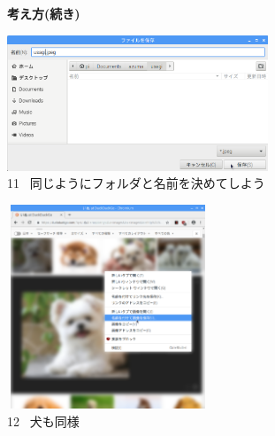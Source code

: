 \documentclass[a4paper,12pt]{jarticle}
\begin{document}
\begin{figure}[t]
  \textbf{考え方(続き)}



  \centering
  \begin{minipage}{\textwidth}
    \begin{minipage}{7.882cm}
      \includegraphics[width=7.811cm,height=4.053cm]{textbook-img103.png}\\
      11 \ 同じようにフォルダと名前を決めてしよう
    \end{minipage}
    \begin{minipage}{2.582cm}
    \end{minipage}
    \begin{minipage}{6.257cm}
      \includegraphics[width=6.041cm,height=6.094cm]{textbook-img092.png}\\
      12 \ 犬も同様
    \end{minipage}
  \end{minipage}


  \bigskip



\end{figure}
\end{document}
